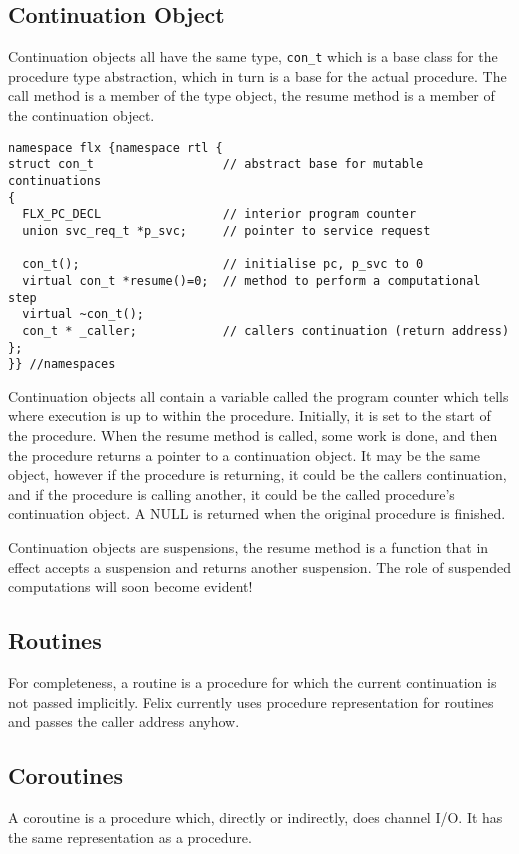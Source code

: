 \documentclass[oneside]{book}
\begin{document}
\subsection{Continuation Object}
Continuation objects all have the same type, \verb$con_t$ which is a base class for
the procedure type abstraction, which in turn is a base for the actual procedure.
The call method is a member of the type object, the resume method is a member
of the continuation object.

\begin{verbatim}
namespace flx {namespace rtl {
struct con_t                  // abstract base for mutable continuations
{
  FLX_PC_DECL                 // interior program counter
  union svc_req_t *p_svc;     // pointer to service request

  con_t();                    // initialise pc, p_svc to 0
  virtual con_t *resume()=0;  // method to perform a computational step
  virtual ~con_t();
  con_t * _caller;            // callers continuation (return address)
};
}} //namespaces
\end{verbatim}

Continuation objects all contain a variable called the program counter which tells
where execution is up to within the procedure. Initially, it is set to the start
of the procedure. When the resume method is called, some work is done, and then
the procedure returns a pointer to a continuation object. It may be the same
object, however if the procedure is returning, it could be the callers continuation,
and if the procedure is calling another, it could be the called procedure's 
continuation object. A NULL is returned when the original procedure is finished.

Continuation objects are suspensions, the resume method is a function that
in effect accepts a suspension and returns another suspension. The role
of suspended computations will soon become evident!

\subsection{Routines}
For completeness, a routine is a procedure for which the current continuation
is not passed implicitly.  Felix currently uses procedure representation for
routines and passes the caller address anyhow.

\subsection{Coroutines}
A coroutine is a procedure which, directly or indirectly, does channel I/O.
It has the same representation as a procedure.
\end{document}
